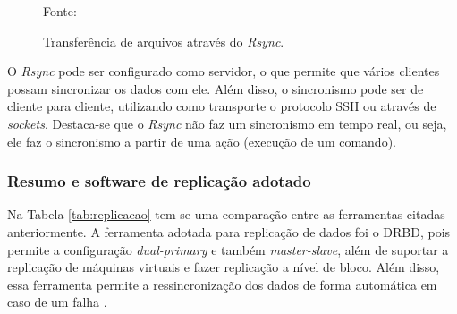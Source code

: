 \begin{figure}[h!]
 \centering
 \caption{Transferência de arquivos através do \textit{Rsync}.}
 Fonte: \citet{lopez2012}
 \label{fig:rsync}
\end{figure}


O \textit{Rsync} pode ser configurado como servidor, o que permite que vários clientes possam sincronizar os dados com ele. 
Além disso, o sincronismo pode ser de cliente para cliente, utilizando como transporte o protocolo \ac{SSH} ou através de \textit{sockets}.
Destaca-se que o \textit{Rsync} não faz um sincronismo em tempo real, ou seja, ele faz o sincronismo a partir de uma ação (execução de um comando).


\subsubsection{Resumo e software de replicação adotado}
\label{section:replicacaoescolhido}

Na Tabela \ref{tab:replicacao} tem-se uma comparação entre as ferramentas citadas anteriormente. 
A ferramenta adotada para replicação de dados foi o \ac{DRBD}, pois permite a configuração \textit{dual-primary} e também \textit{master-slave}, 
além de suportar a replicação de máquinas virtuais e fazer replicação a nível de bloco. Além disso, essa ferramenta permite a ressincronização 
dos dados de forma automática em caso de um falha \cite{drbd}.


